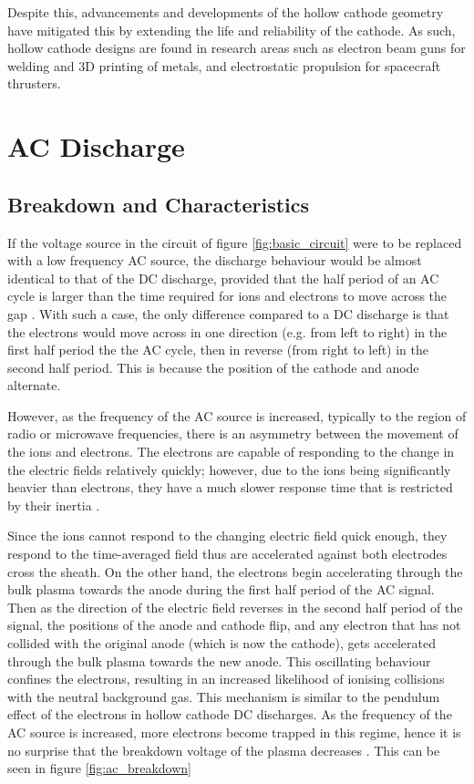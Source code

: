 Despite this, advancements and developments of the hollow cathode geometry have mitigated this by extending the life and reliability of the cathode. As such, hollow cathode designs are found in research areas such as electron beam guns \cite{Kornilov2009, YuBakeev2018} for welding and 3D printing of metals, and electrostatic propulsion \cite{Goebel2021} for spacecraft thrusters.


\section{AC Discharge}
\subsection{Breakdown and Characteristics}

If the voltage source in the circuit of figure \ref{fig:basic_circuit} were to be replaced with a low frequency AC source, the discharge behaviour would be almost identical to that of the DC discharge, provided that the half period of an AC cycle is larger than the time required for ions and electrons to move across the gap \cite{Bogaerts2002}. With such a case, the only difference compared to a DC discharge is that the electrons would move across in one direction (e.g. from left to right) in the first half period the the AC cycle, then in reverse (from right to left) in the second half period. This is because the position of the cathode and anode alternate.

However, as the frequency of the AC source is increased, typically to the region of radio or microwave frequencies, there is an asymmetry between the movement of the ions and electrons. The electrons are capable of responding to the change in the electric fields relatively quickly; however, due to the ions being significantly heavier than electrons, they have a much slower response time that is restricted by their inertia \cite{Chabert2011}.

Since the ions cannot respond to the changing electric field quick enough, they respond to the time-averaged field thus are accelerated against both electrodes cross the sheath. On the other hand, the electrons begin accelerating through the bulk plasma towards the anode during the first half period of the AC signal. Then as the direction of the electric field reverses in the second half period of the signal, the positions of the anode and cathode flip, and any electron that has not collided with the original anode (which is now the cathode), gets accelerated through the bulk plasma towards the new anode. This oscillating behaviour confines the electrons, resulting in an increased likelihood of ionising collisions with the neutral background gas. This mechanism is similar to the pendulum effect of the electrons in hollow cathode DC discharges. As the frequency of the AC source is increased, more electrons become trapped in this regime, hence it is no surprise that the breakdown voltage of the plasma decreases \cite{Chu1992}. This can be seen in figure \ref{fig:ac_breakdown}

